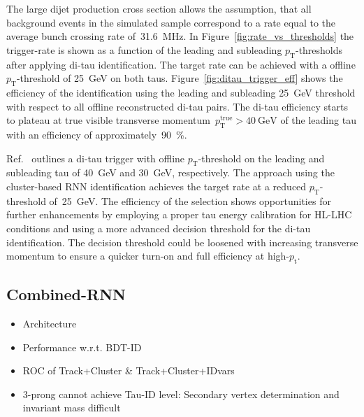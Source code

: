 The large dijet production cross section allows the assumption, that all
background events in the simulated sample correspond to a rate equal to the
average bunch crossing rate of~\SI{31.6}{\mega\hertz}. In
Figure~\ref{fig:rate_vs_thresholds} the trigger-rate is shown as a function of
the leading and subleading $p_\text{T}$-thresholds after applying di-tau
identification. The target rate can be achieved with a offline
$p_\text{T}$-threshold of \SI{25}{\GeV} on both taus.
Figure~\ref{fig:ditau_trigger_eff} shows the efficiency of the identification
using the leading and subleading \SI{25}{\GeV} threshold with respect to all
offline reconstructed di-tau pairs. The di-tau efficiency starts to plateau at
true visible transverse momentum~$p_\text{T}^\text{true} > \SI{40}{\GeV}$ of the
leading tau with an efficiency of approximately~\SI{90}{\percent}.

Ref.~\cite{phase_2_scoping} outlines a di-tau trigger with offline
$p_\text{T}$-threshold on the leading and subleading tau of \SI{40}{\GeV} and
\SI{30}{\GeV}, respectively. The approach using the cluster-based RNN
identification achieves the target rate at a reduced $p_\text{T}$-threshold
of~\SI{25}{\GeV}. The efficiency of the selection shows opportunities for
further enhancements by employing a proper tau energy calibration for HL-LHC
conditions and using a more advanced decision threshold for the di-tau
identification. The decision threshold could be loosened with increasing
transverse momentum to ensure a quicker turn-on and full efficiency at
high-$p_\text{t}$.

\subsection{Combined-RNN}
\label{sec:rnn_combined}



\begin{itemize}
\item Architecture
\item Performance w.r.t. BDT-ID
\item ROC of Track+Cluster \& Track+Cluster+IDvars
\item 3-prong cannot achieve Tau-ID level: Secondary vertex determination and
  invariant mass difficult
\end{itemize}


